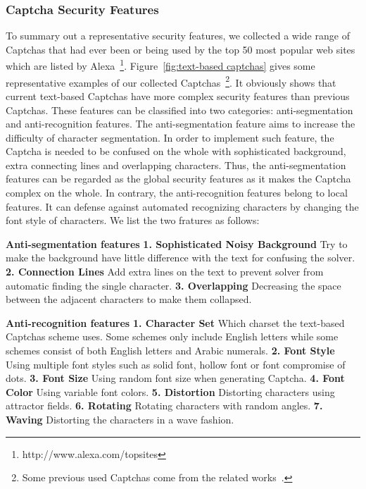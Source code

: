 \subsubsection{Captcha Security Features} \label{section: sccturity_features}
To summary out a representative security features, we collected a wide range of Captchas that had ever been or being used by the top 50 most popular web sites which are listed by Alexa~\footnote{http://www.alexa.com/topsites}. Figure~\ref{fig:text-based captchas} gives some representative examples of our collected Captchas~\footnote{Some previous used Captchas come from the related works~\cite{Gao2013The,Gao2016A,Bursztein2011Text}.}. It obviously shows that current text-based Captchas have more complex security features than previous Captchas. These features can be classified into two categories: anti-segmentation and anti-recognition features.
The anti-segmentation feature aims to increase the difficulty of character segmentation. In order to implement such feature, the Captcha is needed to be confused on the whole with sophisticated background, extra connecting lines and overlapping characters. Thus, the anti-segmentation features can be regarded as the global security features as it makes the Captcha complex on the whole.
In contrary, the anti-recognition features belong to local features. It can defense against automated recognizing characters by changing the font style of characters.
We list the two fratures as follows:

\noindent \textbf{Anti-segmentation features} \textbf{1. Sophisticated Noisy Background} Try to make the background have little difference with the text for confusing the solver. \textbf{2. Connection Lines} Add extra lines on the text to prevent solver from automatic finding the single character.
\textbf{3. Overlapping} Decreasing the space between the adjacent characters to make them collapsed.

\noindent \textbf{Anti-recognition features} \textbf{1. Character Set} Which charset the text-based Captchas scheme uses. Some schemes only include English letters while some schemes consist of both English letters and Arabic numerals. \textbf{2. Font Style} Using multiple font styles such as solid font, hollow font or font compromise of dots. \textbf{3. Font Size} Using random font size when generating Captcha. \textbf{4. Font Color} Using variable font colors. \textbf{5. Distortion} Distorting characters using attractor fields. \textbf{6. Rotating} Rotating characters with random angles. \textbf{7. Waving} Distorting the characters in a wave fashion.

